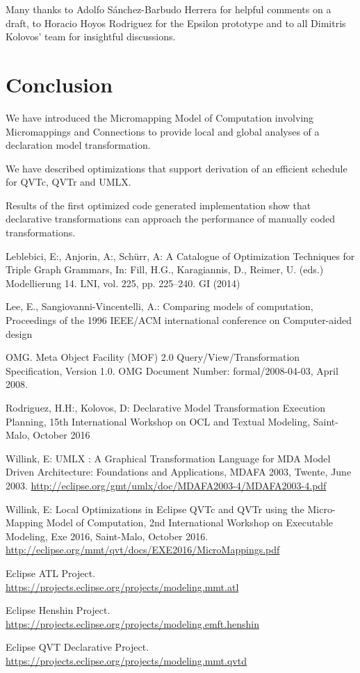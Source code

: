\documentclass{llncs}
\begin{document}
Many thanks to Adolfo S\'anchez-Barbudo Herrera for helpful comments on a draft, to Horacio Hoyos Rodriguez for the Epsilon prototype and to all Dimitris Kolovos' team for insightful discussions.

\section{Conclusion}\label{Conclusion}

We have introduced the Micromapping Model of Computation involving Micromappings and Connections to provide local and global analyses of a declaration model transformation. 

We have described optimizations that support derivation of an efficient schedule for  QVTc, QVTr and UMLX.

Results of the first optimized code generated implementation show that declarative transformations can approach the performance of manually coded transformations.  
%
%
\begin{thebibliography}{}

Leblebici, E:, Anjorin, A:, Sch\"urr, A: A Catalogue of Optimization Techniques for Triple Graph Grammars,
In:  Fill,  H.G.,  Karagiannis,  D.,  Reimer,  U.  (eds.)
Modellierung 14. LNI, vol. 225, pp. 225–240. GI (2014)

Lee, E., Sangiovanni-Vincentelli, A.: Comparing models of computation, Proceedings of the 1996 IEEE/ACM international conference on Computer-aided design

OMG. Meta Object Facility (MOF) 2.0 Query/View/Transformation Specification, Version 1.0.
OMG Document Number: formal/2008-04-03, April 2008.

Rodriguez, H.H:, Kolovos, D: Declarative Model Transformation Execution Planning,
15th International Workshop on OCL and Textual Modeling, Saint-Malo, October 2016

Willink, E: UMLX : A Graphical Transformation Language for MDA
Model Driven Architecture: Foundations and Applications, MDAFA 2003, Twente, June 2003.
\url{http://eclipse.org/gmt/umlx/doc/MDAFA2003-4/MDAFA2003-4.pdf}

Willink, E: Local Optimizations in Eclipse QVTc and QVTr using the Micro-Mapping Model of Computation,
2nd International Workshop on Executable Modeling, Exe 2016, Saint-Malo, October 2016.
\url{http://eclipse.org/mmt/qvt/docs/EXE2016/MicroMappings.pdf}

Eclipse ATL Project.\\
\url{https://projects.eclipse.org/projects/modeling.mmt.atl}

Eclipse Henshin Project.\\
\url{https://projects.eclipse.org/projects/modeling.emft.henshin}

Eclipse QVT Declarative Project.\\
\url{https://projects.eclipse.org/projects/modeling.mmt.qvtd}

\end{thebibliography}
\end{document}
